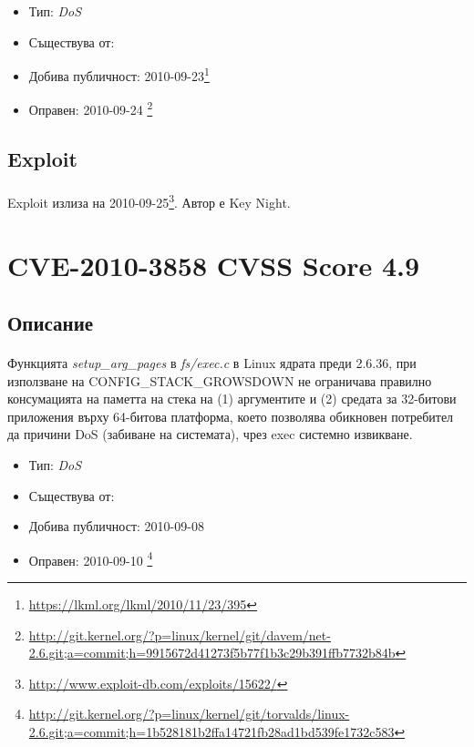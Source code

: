 \documentclass[a4paper,12pt,leqno]{article}
\begin{document}
\begin{itemize}
    \item Тип: \textit{DoS}
    \item Съществува от:
  	\item Добива публичност: 2010-09-23\footnote{\url{https://lkml.org/lkml/2010/11/23/395}}
    \item Оправен: 2010-09-24 \footnote{\url{http://git.kernel.org/?p=linux/kernel/git/davem/net-2.6.git;a=commit;h=9915672d41273f5b77f1b3c29b391ffb7732b84b}}
\end{itemize}

\subsection{Exploit}
\paragraph{}
Exploit излиза на 2010-09-25\footnote{\url{http://www.exploit-db.com/exploits/15622/}}. Автор е Key Night.

\section{CVE-2010-3858 CVSS Score 4.9}
\subsection{Описание}
\paragraph{}
Функцията \textit{setup\_arg\_pages} в \textit{fs/exec.c} в Linux ядрата преди 2.6.36, при използване на CONFIG\_STACK\_GROWSDOWN не ограничава правилно консумацията на паметта на стека на (1) аргументите и (2) средата за 32-битови приложения върху 64-битова платформа, което позволява обикновен потребител да причини DoS (забиване на системата), чрез exec системно извикване.

\begin{itemize}
    \item Тип: \textit{DoS}
    \item Съществува от:
  	\item Добива публичност: 2010-09-08
    \item Оправен: 2010-09-10 \footnote{\url{http://git.kernel.org/?p=linux/kernel/git/torvalds/linux-2.6.git;a=commit;h=1b528181b2ffa14721fb28ad1bd539fe1732c583}}
\end{itemize}
\end{document}

